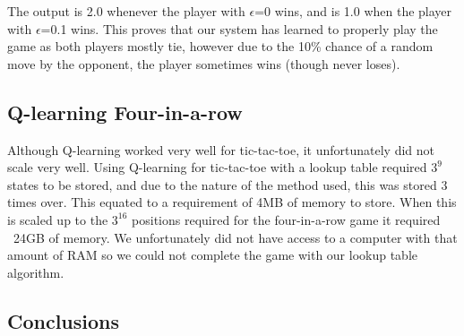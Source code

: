 \documentclass[12pt,a4paper]{article}
\begin{document}
The output is 2.0 whenever the player with $\epsilon$=0 wins, and is 1.0 when the player with $\epsilon$=0.1 wins. This proves that our system has learned to properly play the game as both players mostly tie, however due to the 10\% chance of a random move by the opponent, the player sometimes wins (though never loses).
\subsection*{Q-learning Four-in-a-row}
Although Q-learning worked very well for tic-tac-toe, it unfortunately did not scale very well. Using Q-learning for tic-tac-toe with a lookup table required $3^{9}$ states to be stored, and due to the nature of the method used, this was stored 3 times over. This equated to a requirement of 4MB of memory to store. When this is scaled up to the $3^{16}$ positions required for the four-in-a-row game it required ~24GB of memory. We unfortunately did not have access to a computer with that amount of RAM so we could not complete the game with our lookup table algorithm.
\subsection*{Conclusions}
\end{document}
